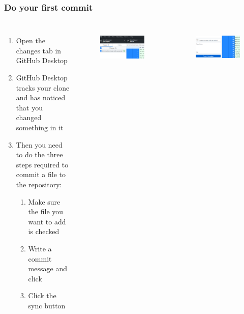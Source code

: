 \documentclass[aspectratio=169]{beamer} %
\begin{document}
\begin{frame}
\frametitle{Do your first commit}

\begin{columns}[c]


\begin{enumerate}
	\item Open the changes tab in GitHub Desktop
	\item GitHub Desktop tracks your clone and has noticed that you changed something in it
	\item Then you need to do the three steps required to commit a file to the repository:
	\begin{enumerate}
		\item Make sure the file you want to add is checked
		\item Write a commit message and click 
		\item Click the sync button
	\end{enumerate}
\end{enumerate}

\begin{figure}
	\centering
	\includegraphics[width=1\linewidth]{img/desktop_changes}
	\label{fig:desktopchanges}
\end{figure}

\vspace{-1cm}

\begin{figure}
	\centering
	\includegraphics[width=1\linewidth]{img/desktop_commit}
	\label{fig:desktop_commit}
\end{figure}

\end{columns}

\end{frame}
\end{document}
